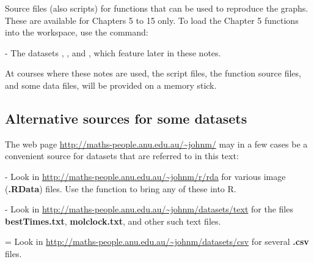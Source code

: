 \begin{itemizz}
\begin{marginfigure}[24pt]
\begin{knitrout}
\color{fgcolor}\begin{kframe}
\begin{alltt}
\hlstd{(}\hlstd{)}
\end{alltt}
\end{kframe}
\end{knitrout}
\end{marginfigure}
Source files (also scripts) for functions that can be used to
  reproduce the graphs. These are available for Chapters 5 to 15
only.  To load the Chapter 5 functions into the workspace,
use the command:
\begin{knitrout}
\color{fgcolor}\begin{kframe}
\begin{alltt}
 \hlkwb{<-} \hlstd{(}\hlstd{,}
                          \hlstd{=}\hlstd{)}
\end{alltt}
\end{kframe}
\end{knitrout}
\item[-] The datasets , , and
  , which feature later in these notes.
\end{itemizz}
At courses where these notes are used, the script files,
the function source files, and some data files, will
be provided on a memory stick.
\newpage

\subsection*{Alternative sources for some datasets}
{\color{gray40}
The web page \url{http://maths-people.anu.edu.au/~johnm/} may in a few cases
be a convenient source for datasets that are referred to in this text:
\begin{itemizz}
\item[-] 
Look in \url{http://maths-people.anu.edu.au/~johnm/r/rda} for
  various image ({\bf .RData}) files.  Use the function  to bring any of these 
  into R.
\item[-] Look in \url{http://maths-people.anu.edu.au/~johnm/datasets/text}
  for the files {\bf bestTimes.txt}, {\bf molclock.txt}, and other such
  text files.
\item[=] Look in \url{http://maths-people.anu.edu.au/~johnm/datasets/csv}
  for several {\bf .csv} files.
\end{itemizz}
\vspace*{-9pt}
}

